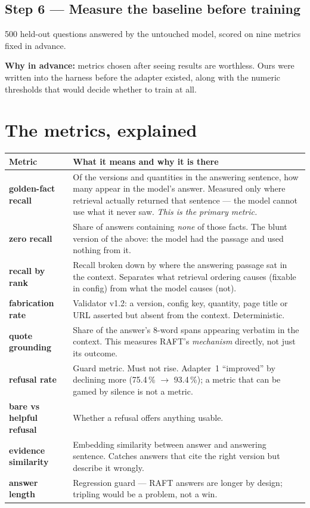 \documentclass[11pt,a4paper]{article}
\begin{document}
\subsection{Step 6 --- Measure the baseline before training}

500 held-out questions answered by the untouched model, scored on nine metrics
fixed in advance.

\textbf{Why in advance:} metrics chosen after seeing results are worthless. Ours
were written into the harness before the adapter existed, along with the numeric
thresholds that would decide whether to train at all.

\section{The metrics, explained}

\begin{table}[h]\centering\small
\begin{tabularx}{\textwidth}{l Y}
\toprule
\textbf{Metric} & \textbf{What it means and why it is there} \\
\midrule
\textbf{golden-fact recall} & Of the versions and quantities in the answering
sentence, how many appear in the model's answer. Measured only where retrieval
actually returned that sentence --- the model cannot use what it never saw.
\emph{This is the primary metric.} \\
 \textbf{zero recall} & Share of answers containing \emph{none} of
those facts. The blunt version of the above: the model had the passage and used
nothing from it. \\
\textbf{recall by rank} & Recall broken down by where the answering passage sat in
the context. Separates what retrieval ordering causes (fixable in config) from what
the model causes (not). \\
 \textbf{fabrication rate} & Validator v1.2: a version, config key,
quantity, page title or URL asserted but absent from the context. Deterministic. \\
\textbf{quote grounding} & Share of the answer's 8-word spans appearing verbatim in
the context. This measures RAFT's \emph{mechanism} directly, not just its outcome. \\
 \textbf{refusal rate} & Guard metric. Must not rise. Adapter~1
``improved'' by declining more (75.4\,\% $\rightarrow$ 93.4\,\%); a metric that can be
gamed by silence is not a metric. \\
\textbf{bare vs helpful refusal} & Whether a refusal offers anything usable. \\
 \textbf{evidence similarity} & Embedding similarity between answer
and answering sentence. Catches answers that cite the right version but describe it
wrongly. \\
\textbf{answer length} & Regression guard --- RAFT answers are longer by design;
tripling would be a problem, not a win. \\
\bottomrule
\end{tabularx}
\end{table}
\end{document}
